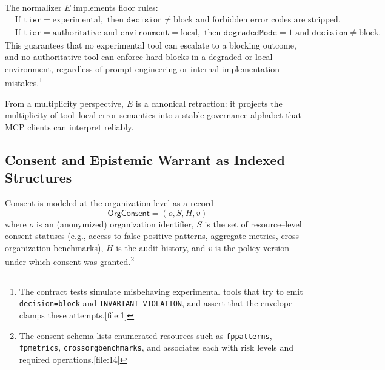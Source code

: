 \documentclass[11pt]{article}
\begin{document}
The normalizer \(E\) implements floor rules:
\begin{align*}
  &\text{If } \texttt{tier} = \text{experimental}, \text{ then } \texttt{decision} \neq \text{block} \text{ and forbidden error codes are stripped.}\\
  &\text{If } \texttt{tier} = \text{authoritative} \text{ and } \texttt{environment} = \text{local}, \text{ then } \texttt{degradedMode} = 1 \text{ and } \texttt{decision} \neq \text{block}. 
\end{align*}
This guarantees that no experimental tool can escalate to a blocking outcome, and no authoritative tool can enforce hard blocks in a degraded or local environment, regardless of prompt engineering or internal implementation mistakes.\footnote{The contract tests simulate misbehaving experimental tools that try to emit \texttt{decision=block} and \texttt{INVARIANT\_VIOLATION}, and assert that the envelope clamps these attempts.[file:1]}

From a multiplicity perspective, \(E\) is a canonical retraction: it projects the multiplicity of tool--local error semantics into a stable governance alphabet that MCP clients can interpret reliably.

\subsection{Consent and Epistemic Warrant as Indexed Structures}

Consent is modeled at the organization level as a record
\[
  \mathsf{OrgConsent} = (o, S, H, v)
\]
where \(o\) is an (anonymized) organization identifier, \(S\) is the set of resource--level consent statuses (e.g., access to false positive patterns, aggregate metrics, cross--organization benchmarks), \(H\) is the audit history, and \(v\) is the policy version under which consent was granted.\footnote{The consent schema lists enumerated resources such as \texttt{fppatterns}, \texttt{fpmetrics}, \texttt{crossorgbenchmarks}, and associates each with risk levels and required operations.[file:14]}
\end{document}
